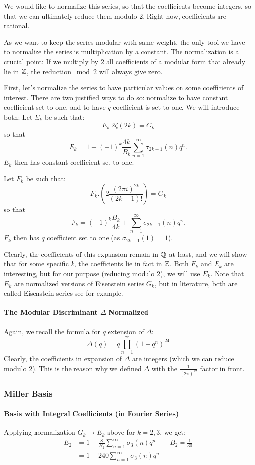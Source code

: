 We would like to normalize this series, so that the coefficients become integers, so that we can ultimately reduce them modulo 2.
Right now, coefficients are rational.

As we want to keep the series modular with same weight, the only tool we have to normalize the series is multiplication by a constant.
The normalization is a crucial point: 
If we multiply by $2$ all coefficients of a modular form that already lie in $\mathbb{Z}$, the reduction $\bmod 2$ will always give zero.

First, let's normalize the series to have particular values on some coefficients of interest.
There are two justified ways to do so: normalize to have constant coefficient set to one, and to have $q$ coefficient is set to one.
We will introduce both:
Let $E_k$ be such that:
$$
E_k.2\zeta(2k) = G_k
$$
so that
$$
E_k = 1 + (-1)^k \frac{4k}{B_k} \sum_{n=1}^{\infty} \sigma_{2k-1}(n)q^n.
$$
$E_k$ then has constant coefficient set to one.

Let $F_k$ be such that:
$$
F_k.\left( 2 \frac{{(2 \pi i)}^{2k}}{(2k-1)!} \right) = G_k
$$
so that
$$
F_k =  (-1)^k \frac{B_k}{4k} + \sum_{n=1}^{\infty} \sigma_{2k-1}(n)q^n.
$$
$F_k$ then has $q$ coefficient set to one (as $\sigma_{2k-1}(1)=1$).

Clearly, the coefficients of this expansion remain in $\mathbb{Q}$ at least, and we will show that for some specific $k$, the coefficients lie in fact in $\mathbb{Z}$.
Both $F_k$ and $E_k$ are interesting, but for our purpose (reducing modulo 2), we will use $E_k$.
Note that $E_k$ are normalized versions of Eisenstein series $G_k$, but in literature, both are called Eisenstein series see \cite[p.6]{IntoductionModularFormsWorkshop} for example.

\paragraph{The Modular Discriminant $\Delta$ Normalized}
Again, we recall the formula for $q$ extension of $\Delta$:
$$
\Delta(q) = q \prod_{n=1}^{\infty} (1-q^n)^{24}
$$
Clearly, the coefficients in expansion of $\Delta$ are integers (which we can reduce modulo 2).
This is the reason why we defined $\Delta$ with the $\frac{1}{(2\pi)^{12}}$ factor in front.


\subsubsection{Miller Basis}
\paragraph{Basis with Integral Coefficients (in Fourier Series)}
Applying normalization $G_k \to E_k$ above for $k=2,3$, we get:
\begin{align*}
	E_2 &= 1 + \frac{8}{B_2} \sum_{n=1}^{\infty} \sigma_{3}(n)q^n \qquad B_2 = \frac{1}{30} \\
	    &= 1 + 240 \sum_{n=1}^{\infty} \sigma_{3}(n)q^n
\end{align*}

